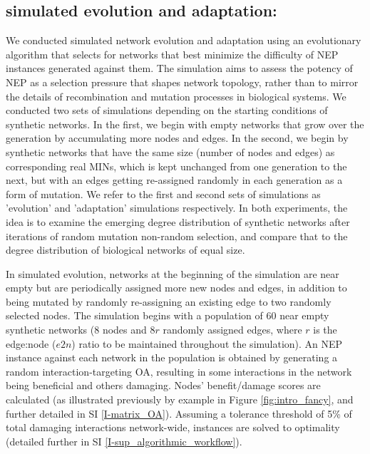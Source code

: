 \subsection{simulated evolution and adaptation:}\label{evolution_results}
    We conducted simulated network evolution and adaptation using an evolutionary algorithm that selects for networks that best minimize the difficulty of NEP instances generated against them. The simulation aims to assess the potency of NEP as a selection pressure that shapes network topology, rather than to mirror the details of recombination and mutation processes in biological systems. We conducted two sets of simulations depending on the starting conditions of synthetic networks. In the first, we begin with empty networks that grow over the generation by accumulating more nodes and edges. In the second, we begin by synthetic networks that have the same size (number of nodes and edges) as corresponding real MINs, which is kept unchanged from one generation to the next, but with an edges getting re-assigned randomly in each generation as a form of mutation. We refer to the first and second sets of simulations as 'evolution' and 'adaptation' simulations respectively. In both experiments, the idea is to examine the emerging degree distribution of synthetic networks after iterations of random mutation non-random selection, and compare that  to the degree distribution of biological networks of equal size.

    In simulated evolution, networks at the beginning of the simulation are near empty but are periodically assigned more new nodes and edges, in addition to being mutated by randomly re-assigning an existing edge to two randomly selected nodes. The simulation begins with a population of 60 near empty synthetic networks (8 nodes and $8r$ randomly assigned edges, where $r$ is the edge:node ($e2n$) ratio to be maintained throughout the simulation). An NEP instance against each network in the population is obtained by generating a random interaction-targeting OA, resulting in some interactions in the network being beneficial and others damaging. Nodes' benefit/damage scores are calculated (as illustrated previously by example in Figure \ref{fig:intro_fancy}, and further detailed in SI \ref{I-matrix_OA}). Assuming a tolerance threshold of 5\% of total damaging interactions network-wide, instances are solved to optimality (detailed further in SI \ref{I-sup_algorithmic_workflow}).

